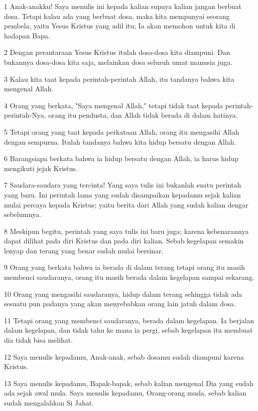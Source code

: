 \par 1 Anak-anakku! Saya menulis ini kepada kalian supaya kalian jangan berbuat dosa. Tetapi kalau ada yang berbuat dosa, maka kita mempunyai seorang pembela, yaitu Yesus Kristus yang adil itu; Ia akan memohon untuk kita di hadapan Bapa.
\par 2 Dengan perantaraan Yesus Kristus itulah dosa-dosa kita diampuni. Dan bukannya dosa-dosa kita saja, melainkan dosa seluruh umat manusia juga.
\par 3 Kalau kita taat kepada perintah-perintah Allah, itu tandanya bahwa kita mengenal Allah.
\par 4 Orang yang berkata, "Saya mengenal Allah," tetapi tidak taat kepada perintah-perintah-Nya, orang itu pendusta, dan Allah tidak berada di dalam hatinya.
\par 5 Tetapi orang yang taat kepada perkataan Allah, orang itu mengasihi Allah dengan sempurna. Itulah tandanya bahwa kita hidup bersatu dengan Allah.
\par 6 Barangsiapa berkata bahwa ia hidup bersatu dengan Allah, ia harus hidup mengikuti jejak Kristus.
\par 7 Saudara-saudara yang tercinta! Yang saya tulis ini bukanlah suatu perintah yang baru. Ini perintah lama yang sudah disampaikan kepadamu sejak kalian mulai percaya kepada Kristus; yaitu berita dari Allah yang sudah kalian dengar sebelumnya.
\par 8 Meskipun begitu, perintah yang saya tulis ini baru juga; karena kebenarannya dapat dilihat pada diri Kristus dan pada diri kalian. Sebab kegelapan semakin lenyap dan terang yang benar sudah mulai bersinar.
\par 9 Orang yang berkata bahwa ia berada di dalam terang tetapi orang itu masih membenci saudaranya, orang itu masih berada dalam kegelapan sampai sekarang.
\par 10 Orang yang mengasihi saudaranya, hidup dalam terang sehingga tidak ada sesuatu pun padanya yang akan menyebabkan orang lain jatuh dalam dosa.
\par 11 Tetapi orang yang membenci saudaranya, berada dalam kegelapan. Ia berjalan dalam kegelapan, dan tidak tahu ke mana ia pergi, sebab kegelapan itu membuat dia tidak bisa melihat.
\par 12 Saya menulis kepadamu, Anak-anak, sebab dosamu sudah diampuni karena Kristus.
\par 13 Saya menulis kepadamu, Bapak-bapak, sebab kalian mengenal Dia yang sudah ada sejak awal mula. Saya menulis kepadamu, Orang-orang muda, sebab kalian sudah mengalahkan Si Jahat.
